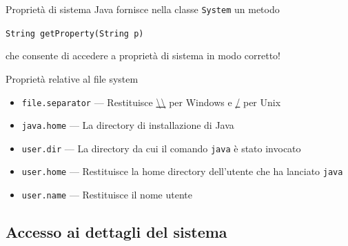 \documentclass[presentation]{beamer}
\begin{document}
\begin{frame}{Proprietà di sistema}
	Java fornisce nella classe \texttt{System} un metodo\\
	\begin{center}
	{\Large \texttt{String getProperty(String p)}}
	\end{center}
	che consente di accedere a proprietà di sistema in modo corretto!
	\vspace{10pt}
	\begin{block}{Proprietà relative al file system}
		\begin{itemize}
			\item \texttt{file.separator} --- Restituisce \url{\\} per Windows e \url{/} per Unix
			\item \texttt{java.home} --- La directory di installazione di Java
			\item \texttt{user.dir} --- La directory da cui il comando \texttt{java} è stato invocato
			\item \texttt{user.home} --- Restituisce la home directory dell'utente che ha lanciato \texttt{java}
			\item \texttt{user.name} --- Restituisce il nome utente
		\end{itemize}
	\end{block}
\end{frame}

\subsection{Accesso ai dettagli del sistema}
\end{document}
